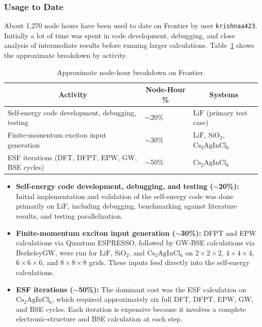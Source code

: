 \documentclass[11pt]{article}
\begin{document}
\subsubsection{Usage to Date}

About 1,270 node hours have been used to date on Frontier by user
\texttt{krishnaa423}. Initially a lot of time was spent in
code development, debugging, and close analysis of intermediate results 
before running larger calculations. Table~\ref{tab:allocation}
shows the approximate breakdown by activity.

\begin{table}[h]
\centering
\small
\begin{tabular}{|l|l|l|}
\hline
\multicolumn{1}{|c|}{\textbf{Activity}} & \multicolumn{1}{c|}{\textbf{Node-Hour \%}} & \multicolumn{1}{c|}{\textbf{Systems}} \\
\hline
Self-energy code development, debugging, testing & $\sim$20\% &
    \(\mathrm{LiF}\) (primary test case) \\
\hline
Finite-momentum exciton input generation & $\sim$30\% &
    \(\mathrm{LiF}\), \(\mathrm{SiO_2}\), \(\mathrm{Cs_2AgInCl_6}\) \\
\hline
ESF iterations (DFT, DFPT, EPW, GW, BSE cycles) & $\sim$50\% &
    \(\mathrm{Cs_2AgInCl_6}\) \\
\hline
\end{tabular}
\caption{Approximate node-hour breakdown on Frontier.}
\label{tab:allocation}
\end{table}

\begin{itemize}
    \item \textbf{Self-energy code development, debugging, and testing
        ($\sim$20\%):} Initial implementation and validation of the self-energy
        code was done primarily on \(\mathrm{LiF}\), including debugging,
        benchmarking against literature results, and testing parallelization.
    \item \textbf{Finite-momentum exciton input generation ($\sim$30\%):} DFPT
        and EPW calculations via Quantum ESPRESSO, followed by GW-BSE
        calculations via BerkeleyGW, were run for
        \(\mathrm{LiF}\), \(\mathrm{SiO_2}\), and \(\mathrm{Cs_2AgInCl_6}\)
        on \(2\times2\times2\), \(4\times4\times4\), \(6\times6\times6\), and
        \(8\times8\times8\) grids. These inputs feed directly into the
        self-energy calculations.
    \item \textbf{ESF iterations ($\sim$50\%):} The dominant cost was the ESF
        calculation on \(\mathrm{Cs_2AgInCl_6}\), which required approximately
        six full DFT, DFPT, EPW, GW, and BSE cycles. Each iteration is
        expensive because it involves a complete electronic-structure and BSE
        calculation at each step.
\end{itemize}
\end{document}
